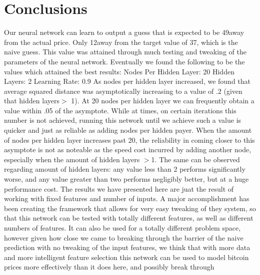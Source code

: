 \documentclass[a4paper,11pt]{article}
\begin{document}
\section{Conclusions}
Our neural network can learn to output a guess that is expected to be 49\cent away from the actual price.  Only 12\cent away from
the target value of 37\cent, which is the naive guess.  This value was attained through much testing and tweaking of the parameters
of the neural network.  Eventually we found the following to be the values which attained the best results:
\newline \newline Nodes Per Hidden Layer: 20
\newline \newline Hidden Layers: 2
\newline \newline Learning Rate: 0.9
\newline \newline
As nodes per hidden layer increased, we found that average squared distance was asymptotically increasing to a value of .2 (given
that hidden layers$ >$ 1).  At 20 nodes per hidden layer we can frequently obtain a value within .05 of the asymptote.  While at
times, on certain iterations this number is not achieved, running this network until we achieve such a value is quicker
and just as reliable as adding nodes per hidden payer.  When the amount of nodes per hidden layer increases past 20, the reliability
in coming closer to this asymptote is not as noteable as the speed cost incurred by adding another node, especially when the 
amount of hidden layers $ > $1.  
\newline \newline
The same can be observed regarding amount of hidden layers: any value less than 2 performs significantly worse, and any value greater
than two performs negligibly better, but at a huge performance cost.  The results we have presented here are juat the result of
working with fixed features and number of inputs.  A major accomplishment has been creating the framework that allows for very easy
tweaking of they system, so that this network can be tested with totally different features, as well as different numbers of 
features.  It can also be used for a totally different problem space, however given how close we came to breaking through the
barrier of the naive prediction with no tweaking of the input features, we think that with more data and more intelligent feature
selection this network can be used to model bitcoin prices more effectively than it does here, and possibly break through
\end{document}
